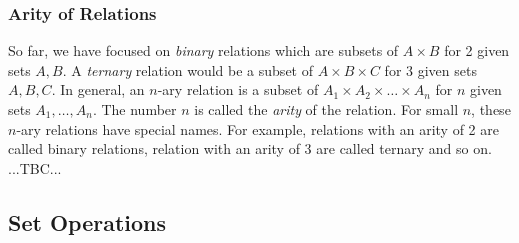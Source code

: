 \subsubsection{Arity of Relations}
So far, we have focused on \emph{binary} relations which are subsets of $A \times B$ for 2 given sets $A,B$. A \emph{ternary} relation would be a subset of $A \times B \times C$ for 3 given sets $A,B,C$. In general, an $n$-ary relation is a subset of $A_1 \times A_2 \times \ldots \times A_n$ for $n$ given sets $A_1,\ldots,A_n$. The number $n$ is called the \emph{arity} of the relation. For small $n$, these $n$-ary relations have special names. For example, relations with an arity of 2 are called binary relations, relation with an arity of 3 are called ternary and so on. ...TBC...




\subsection{Set Operations}

